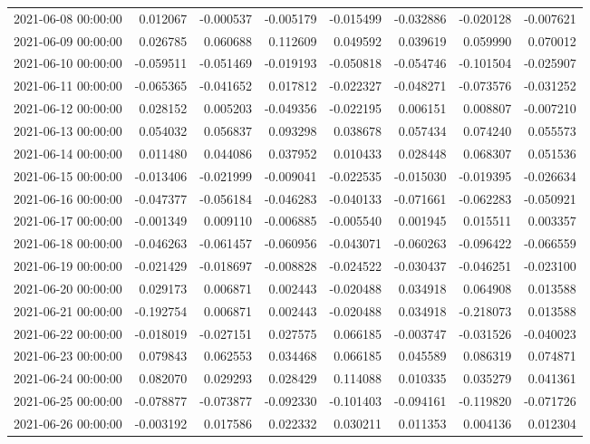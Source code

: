 \begin{tabular}{lrrrrrrr}
2021-06-08 00:00:00 & 0.012067 & -0.000537 & -0.005179 & -0.015499 & -0.032886 & -0.020128 & -0.007621 \\
2021-06-09 00:00:00 & 0.026785 & 0.060688 & 0.112609 & 0.049592 & 0.039619 & 0.059990 & 0.070012 \\
2021-06-10 00:00:00 & -0.059511 & -0.051469 & -0.019193 & -0.050818 & -0.054746 & -0.101504 & -0.025907 \\
2021-06-11 00:00:00 & -0.065365 & -0.041652 & 0.017812 & -0.022327 & -0.048271 & -0.073576 & -0.031252 \\
2021-06-12 00:00:00 & 0.028152 & 0.005203 & -0.049356 & -0.022195 & 0.006151 & 0.008807 & -0.007210 \\
2021-06-13 00:00:00 & 0.054032 & 0.056837 & 0.093298 & 0.038678 & 0.057434 & 0.074240 & 0.055573 \\
2021-06-14 00:00:00 & 0.011480 & 0.044086 & 0.037952 & 0.010433 & 0.028448 & 0.068307 & 0.051536 \\
2021-06-15 00:00:00 & -0.013406 & -0.021999 & -0.009041 & -0.022535 & -0.015030 & -0.019395 & -0.026634 \\
2021-06-16 00:00:00 & -0.047377 & -0.056184 & -0.046283 & -0.040133 & -0.071661 & -0.062283 & -0.050921 \\
2021-06-17 00:00:00 & -0.001349 & 0.009110 & -0.006885 & -0.005540 & 0.001945 & 0.015511 & 0.003357 \\
2021-06-18 00:00:00 & -0.046263 & -0.061457 & -0.060956 & -0.043071 & -0.060263 & -0.096422 & -0.066559 \\
2021-06-19 00:00:00 & -0.021429 & -0.018697 & -0.008828 & -0.024522 & -0.030437 & -0.046251 & -0.023100 \\
2021-06-20 00:00:00 & 0.029173 & 0.006871 & 0.002443 & -0.020488 & 0.034918 & 0.064908 & 0.013588 \\
2021-06-21 00:00:00 & -0.192754 & 0.006871 & 0.002443 & -0.020488 & 0.034918 & -0.218073 & 0.013588 \\
2021-06-22 00:00:00 & -0.018019 & -0.027151 & 0.027575 & 0.066185 & -0.003747 & -0.031526 & -0.040023 \\
2021-06-23 00:00:00 & 0.079843 & 0.062553 & 0.034468 & 0.066185 & 0.045589 & 0.086319 & 0.074871 \\
2021-06-24 00:00:00 & 0.082070 & 0.029293 & 0.028429 & 0.114088 & 0.010335 & 0.035279 & 0.041361 \\
2021-06-25 00:00:00 & -0.078877 & -0.073877 & -0.092330 & -0.101403 & -0.094161 & -0.119820 & -0.071726 \\
2021-06-26 00:00:00 & -0.003192 & 0.017586 & 0.022332 & 0.030211 & 0.011353 & 0.004136 & 0.012304 \\

\end{tabular}
